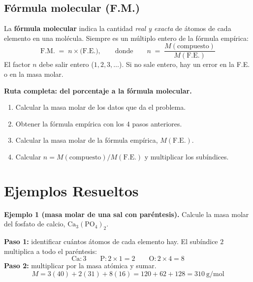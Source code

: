 \documentclass[12pt, letterpaper]{article}
\begin{document}
\subsection{Fórmula molecular (F.M.)}

\begin{cuadroteoria}
  La \textbf{fórmula molecular} indica la cantidad \emph{real y exacta} de átomos de cada elemento en una molécula. Siempre es un múltiplo entero de la fórmula empírica:
  \[
    \text{F.M.} \;=\; n\times\bigl(\text{F.E.}\bigr),
    \qquad\text{donde}\qquad
    n \;=\; \frac{M(\text{compuesto})}{M(\text{F.E.})}
  \]
  El factor $n$ debe salir entero ($1, 2, 3,\dots$). Si no sale entero, hay un error en la F.E. o en la masa molar.
\end{cuadroteoria}

\begin{cuadropasos}
  \textbf{Ruta completa: del porcentaje a la fórmula molecular.}
  \begin{enumerate}[leftmargin=*]
    \item Calcular la masa molar de los datos que da el problema.
    \item Obtener la fórmula empírica con los 4 pasos anteriores.
    \item Calcular la masa molar de la fórmula empírica, $M(\text{F.E.})$.
    \item Calcular $n = M(\text{compuesto}) / M(\text{F.E.})$ y multiplicar los subíndices.
  \end{enumerate}
\end{cuadropasos}

\section{Ejemplos Resueltos}

\noindent\textbf{Ejemplo 1 (masa molar de una sal con paréntesis).} Calcule la masa molar del fosfato de calcio, $\text{Ca}_3(\text{PO}_4)_2$.

\begin{cuadrosolucion}
  \textbf{Paso 1:} identificar cuántos átomos de cada elemento hay. El subíndice $2$ multiplica a todo el paréntesis:
  \[
    \text{Ca}:3 \qquad \text{P}: 2\times1 = 2 \qquad \text{O}: 2\times4 = 8
  \]
  \textbf{Paso 2:} multiplicar por la masa atómica y sumar.
  \[
    M = 3(40) + 2(31) + 8(16) = 120 + 62 + 128 = \boxed{310\ \text{g/mol}}
  \]
\end{cuadrosolucion}
\end{document}
